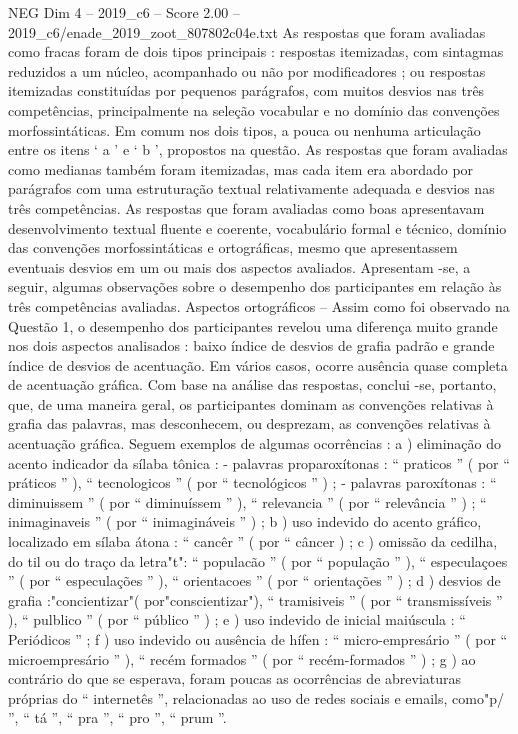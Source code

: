 \begin{textsample}{NEG Dim 4 – 2019\_c6 – Score 2.00 – 2019\_c6/enade\_2019\_zoot\_807802c04e.txt}
As respostas que foram avaliadas como fracas foram de dois tipos principais : respostas itemizadas, com sintagmas reduzidos a um núcleo, acompanhado ou não por modificadores ; ou respostas itemizadas constituídas por pequenos parágrafos, com muitos desvios nas três competências, principalmente na seleção vocabular e no domínio das convenções morfossintáticas.
Em comum nos dois tipos, a pouca ou nenhuma articulação entre os itens ‘ a ’ e ‘ b ’, propostos na questão.
As respostas que foram avaliadas como medianas também foram itemizadas, mas cada item era abordado por parágrafos com uma estruturação textual relativamente adequada e desvios nas três competências.
As respostas que foram avaliadas como boas apresentavam desenvolvimento textual fluente e coerente, vocabulário formal e técnico, domínio das convenções morfossintáticas e ortográficas, mesmo que apresentassem eventuais desvios em um ou mais dos aspectos avaliados.
Apresentam -se, a seguir, algumas observações sobre o desempenho dos participantes em relação às três competências avaliadas.
Aspectos ortográficos – Assim como foi observado na Questão 1, o desempenho dos participantes revelou uma diferença muito grande nos dois aspectos analisados : baixo índice de desvios de grafia padrão e grande índice de desvios de acentuação.
Em vários casos, ocorre ausência quase completa de acentuação gráfica.
Com base na análise das respostas, conclui -se, portanto, que, de uma maneira geral, os participantes dominam as convenções relativas à grafia das palavras, mas desconhecem, ou desprezam, as convenções relativas à acentuação gráfica.
Seguem exemplos de algumas ocorrências : a ) eliminação do acento indicador da sílaba tônica : - palavras proparoxítonas : “ praticos ” ( por “ práticos ” ), “ tecnologicos ” ( por “ tecnológicos ” ) ; - palavras paroxítonas : “ diminuissem ” ( por “ diminuíssem ” ), “ relevancia ” ( por “ relevância ” ) ; “ inimaginaveis ” ( por “ inimagináveis ” ) ; b ) uso indevido do acento gráfico, localizado em sílaba átona : “ cancêr ” ( por “ câncer ) ; c ) omissão da cedilha, do til ou do traço da letra"t": “ populacão ” ( por “ população ” ), “ especulaçoes ” ( por “ especulações ” ), “ orientacoes ” ( por “ orientações ” ) ; d ) desvios de grafia :"concientizar"( por"conscientizar"), “ tramisiveis ” ( por “ transmissíveis ” ), “ pulblico ” ( por “ público ” ) ; e ) uso indevido de inicial maiúscula : “ Periódicos ” ; f ) uso indevido ou ausência de hífen : “ micro-empresário ” ( por “ microempresário ” ), “ recém formados ” ( por “ recém-formados ” ) ; g ) ao contrário do que se esperava, foram poucas as ocorrências de abreviaturas próprias do “ internetês ”, relacionadas ao uso de redes sociais e emails, como"p/ ”, “ tá ”, “ pra ”, “ pro ”, “ prum ”.

\end{textsample}
